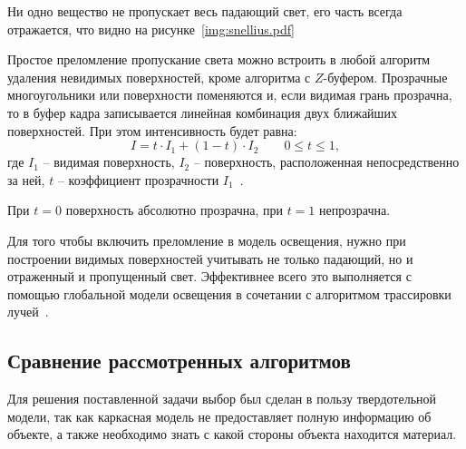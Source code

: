 Ни одно вещество не пропускает весь падающий свет, его часть всегда отражается, что видно на рисунке~\ref{img:snellius.pdf}

Простое преломление пропускание света можно встроить в любой алгоритм удаления невидимых поверхностей, кроме алгоритма с $Z$-буфером.
Прозрачные многоугольники или поверхности поменяются и, если видимая грань прозрачна, то в буфер кадра записывается линейная комбинация двух ближайших поверхностей. При этом интенсивность будет равна:
\begin{equation}
	I = t\cdot I_1 + (1 - t)\cdot I_2 \qquad 0 \leq t \leq 1,
\end{equation}
где $I_1$ -- видимая поверхность, $I_2$ -- поверхность, расположенная непосредственно за ней, $t$ -- коэффициент прозрачности $I_1$~\cite{rodgers}. 

При $t = 0$  поверхность абсолютно прозрачна, при $t = 1$ непрозрачна.

Для того чтобы включить преломление в модель освещения, нужно при построении видимых поверхностей учитывать не только падающий, но и отраженный и пропущенный свет. Эффективнее всего это выполняется с помощью глобальной модели освещения в сочетании с алгоритмом трассировки лучей~\cite{rodgers}.

\subsection{Сравнение рассмотренных алгоритмов}

Для решения поставленной задачи выбор был сделан в пользу твердотельной модели, так как каркасная модель не предоставляет полную информацию об объекте, а также необходимо знать с какой стороны объекта находится материал.

